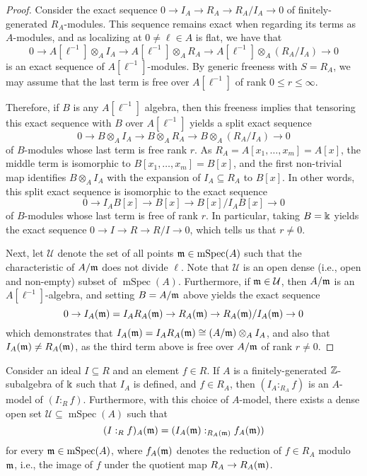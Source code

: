 \documentclass[11pt]{amsart}
\newcommand{\mspec}{\operatorname{mSpec}}
\begin{document}
\begin{proof} Consider the exact sequence $0 \to I_A \to R_A \to R_A/I_A \to 0$ of finitely-generated $R_A$-modules.  This sequence remains exact when regarding its terms as $A$-modules, and as localizing at $0 \neq \ell \in A$ is flat, we have that 
\[ 0 \to A[\ell^{-1}] \otimes_A I_A \to A[\ell^{-1}] \otimes_A R_A \to A[\ell^{-1}] \otimes_A (R_A/I_A) \to 0 \] 
is an exact sequence of $A[\ell^{-1}]$-modules.  By generic freeness with $S=R_A$, we may assume that the last term is free over $A[\ell^{-1}]$ of rank $0 \leq r \leq \infty$. 

Therefore,  if $B$ is any $A[\ell^{-1}]$ algebra, then this freeness implies that tensoring this exact sequence with $B$ over $A[\ell^{-1}]$ yields a split exact sequence \[ 0 \to B \otimes_A I_A \to B \otimes_A R_A \to B \otimes_A (R_A/I_A) \to 0 \]  of $B$-modules whose last term is free rank $r$.  As $R_A = A[x_1, \ldots, x_m]=A[x]$, the middle term is isomorphic to $B[x_1, \ldots, x_m]=B[x]$,  and the first non-trivial map identifies $B \otimes_A I_A$ with the expansion of $I_A \subseteq R_A$ to $B[x]$.   In other words, this split exact sequence is isomorphic to the exact sequence
 \[ 0 \to I_A  B[x] \to B[x] \to  B[x] / I_A B[x]  \to 0\] 
 of $B$-modules whose last term is free of rank $r$. In particular, taking $B=\Bbbk$ yields the exact sequence $0 \to I \to R \to R/I \to 0$, which tells us that $r \neq 0$.

Next, let $\mathcal{U}$ denote the set of all points $\maxi \in \mspec(A)$ such that the characteristic of $A/\mathfrak{m}$ does not divide $\ell$.  Note that $\mathcal{U}$ is an open dense (i.e., open and non-empty) subset of $\mspec(A)$.  Furthermore, if $\mathfrak{m} \in \mathcal{U}$, then $A/\mathfrak{m}$ is an $A[\ell^{-1}]$-algebra, and setting $B=A/\mathfrak{m}$ above yields the exact sequence 
\[ 0 \to I_A(\mathfrak{m}) = I_A R_A(\mathfrak{m}) \to R_A(\mathfrak{m}) \to R_A(\mathfrak{m})/ I_A(\mathfrak{m}) \to 0\] which demonstrates that $I_A(\mathfrak{m}) = I_A R_A(\mathfrak{m})  \cong (A/\mathfrak{m}) \otimes_A I_A$, and also that $I_A(\mathfrak{m}) \neq R_A(\mathfrak{m})$, as the third term above is free over $A/\mathfrak{m}$ of rank $r \neq 0$.
\end{proof}

\begin{lemma}
\label{colon mod p: L}
Consider an ideal $I \subseteq R$ and an element $f \in R$.  If $A$ is a finitely-generated $\mathbb{Z}$-subalgebra of $\Bbbk$ such that $I_A$ is defined, and $f \in R_A$, then  $(I_A :_{R_A} f)$ is an $A$-model of $(I:_R f)$.   Furthermore, with this choice of $A$-model, there exists a dense open set $\mathcal{U} \subseteq \mspec(A)$ such that 
\[ (I :_R f)_A(\mathfrak{m}) = (I_A(\mathfrak{m}) :_{R_A(\mathfrak{m})} f_A(\mathfrak{m})) \]
for every $\maxi \in \mspec(A)$, where $f_A(\mathfrak{m})$ denotes the reduction of $f \in R_A$ modulo $\mathfrak{m}$, i.e., the image of $f$ under the quotient map $R_A \to R_A(\mathfrak{m})$.
 \end{lemma}
\end{document}
